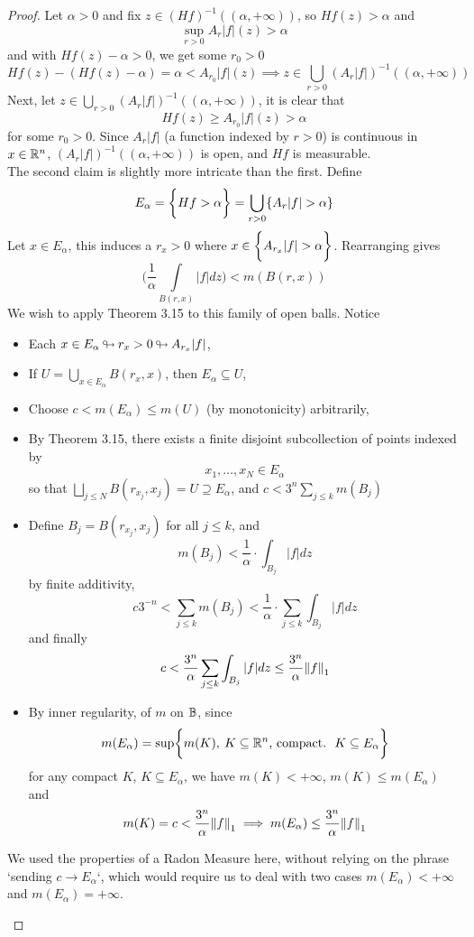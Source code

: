 \documentclass[../../main.tex]{subfiles}
\begin{document}
\begin{proof}
    Let $\alpha>0$ and fix $z\in (Hf)^{-1}((\alpha,+\infty))$, so $Hf(z)>\alpha$ and 
    \[\sup_{r>0}A_r|f|(z)>\alpha\]
    and with $Hf(z)-\alpha>0$, we get some $r_0>0$ \[
    Hf(z)-(Hf(z)-\alpha)=\alpha < A_{r_0}|f|(z)\implies z\in \bigcup\limits_{r>0}(A_r|f|)^{-1}((\alpha,+\infty))
    \]
    Next, let $z\in\bigcup\limits_{r>0}(A_r|f|)^{-1}((\alpha,+\infty))$, it is clear that
    \[
    Hf(z)\geq A_{r_0}|f|(z)>\alpha
    \]
    for some $r_0>0$. Since $A_r|f|$ (a function indexed by $r>0$) is continuous in $x\in{\mathbb{R}^n}$, $(A_r|f|)^{-1}((\alpha,+\infty))$ is open, and $Hf$ is measurable.\\

    The second claim is slightly more intricate than the first. Define 
    \[
    E_\alpha = \bigset{Hf>\alpha}=\bigcup\limits_{r>0}\{A_r|f|>\alpha\}
    \]
    Let $x\in E_\alpha$, this induces a $r_x>0$ where $x\in\bigset{A_{r_x}|f|>\alpha}$. Rearranging gives
    \[
    \biggl(\dfrac{1}{\alpha}\int\limits_{B(r,x)}|f|dz\biggr)<m(B(r,x))
    \]
    We wish to apply Theorem 3.15 to this family of open balls. Notice
    \begin{itemize}
        \item Each $x\in E_\alpha{\:\looparrowright\:} r_x>0{\:\looparrowright\:} A_{r_x}|f|$,
        \item If $U = \bigcup\limits_{x\in E_\alpha} B(r_x,x)$, then $E_\alpha\subseteq U$,
        \item Choose $c<m(E_\alpha)\leq m(U)$ (by monotonicity) arbitrarily, 
        \item By Theorem 3.15, there exists a finite disjoint subcollection of points indexed by 
        \[
        x_1,\ldots,x_N \in E_\alpha
        \]
        so that $\bigsqcup_{j\leq N}B(r_{x_j},x_j)=U\supseteq E_\alpha$, and $c<3^n\sum_{j\leq k}m(B_j)$
        \item Define $B_j= B(r_{x_j}, x_j)$ for all $j\leq k$, and 
        \[
        m(B_j)< \dfrac{1}{\alpha}\cdot\int_{B_j}|f|dz
        \]
        by finite additivity,
        \[
        c3^{-n}<\sum_{j\leq k}m(B_j)<\dfrac{1}{\alpha}\cdot\sum_{j\leq k}\int_{B_j}|f|dz
        \]
        and finally
        \[
        c<\dfrac{3^n}{\alpha}\sum_{j\leq k}\int_{B_j}|f|dz\leq \dfrac{3^n}{\alpha}\norm{f}_1
        \]
        \item By inner regularity, of $m$ on ${\mathbb{B}}$, since 
        \[
        m(E_\alpha) = \sup\biggl\{{m(K),\: K\subseteq{\mathbb{R}^n}\text{, compact. } \: K\subseteq E_\alpha}\biggr\}
        \]
        for any compact $K$, $K\subseteq E_\alpha$, we have $m(K)<+\infty$, $m(K)\leq m(E_\alpha)$ and 
        \[
        m(K)=c<\dfrac{3^n}{\alpha}\norm{f}_1\implies m(E_\alpha)\leq \dfrac{3^n}{\alpha}\norm{f}_1
        \]
    \end{itemize}
    \begin{remark}
        We used the properties of a Radon Measure here, without relying on the phrase `sending $c\to E_\alpha$`, which would require us to deal with two cases $m(E_\alpha)<+\infty$ and $m(E_\alpha)=+\infty$.
    \end{remark}
\end{proof}
\end{document}
